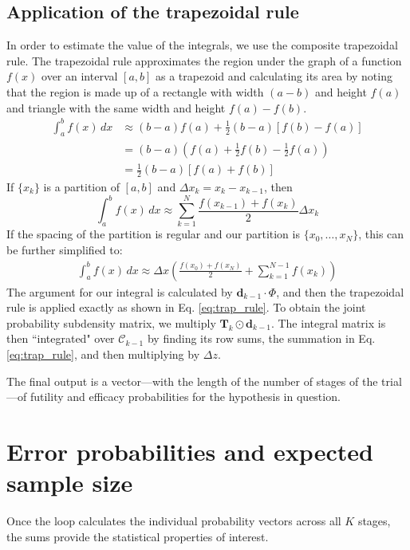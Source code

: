 \documentclass{article}
\begin{document}
\subsection{Application of the trapezoidal rule}
%
In order to estimate the value of the integrals, we use the composite trapezoidal rule. The trapezoidal rule approximates the region under the graph of a function $f(x)$ over an interval $[a, b]$ as a trapezoid and calculating its area by noting that the region is made up of a rectangle with width $(a-b)$ and height $f(a)$ and triangle with the same width and height $f(a)-f(b)$.
\begin{align}
    \int_a^b f(x)\,dx &\approx (b-a)f(a)+ \frac{1}{2}(b-a)[f(b)-f(a)] \\
    &=(b-a)\left( f(a)+\frac{1}{2}f(b)-\frac{1}{2}f(a) \right)\\
    &=\frac{1}{2}(b-a)[f(a)+f(b)]
\end{align}
%
If $\{x_k\}$ is a partition of $[a,b]$ and $\Delta x_k=x_k-x_{k-1}$, then
\begin{equation}
    \int_a^b f(x)\,dx \approx \sum_{k=1}^N \frac{f(x_{k-1})+f(x_k)}{2} \Delta x_k
\end{equation}
%
If the spacing of the partition is regular and our partition is $\{x_0,\dots,x_N\}$, this can be further simplified to:
%
\begin{align} \label{eq:trap_rule}
    \int_a^b f(x)\,dx \approx \Delta x\left(\frac{f(x_0)+f(x_N)}{2} + \sum_{k=1}^{N-1}f(x_k)\right)
\end{align}
%
The argument for our integral is calculated by $\mathbf{d}_{k-1} \cdot \Phi$, and then the trapezoidal rule is applied exactly as shown in Eq. \eqref{eq:trap_rule}. To obtain the joint probability subdensity matrix, we multiply $\mathbf{T}_{k} \odot \mathbf{d}_{k-1}$. The integral matrix is then ``integrated" over $\mathcal{C}_{k-1}$ by finding its row sums, the summation in Eq. \eqref{eq:trap_rule}, and then multiplying by $\Delta z$. 

The final output is a vector---with the length of the number of stages of the trial---of futility and efficacy probabilities for the hypothesis in question.
%
\section{Error probabilities and expected sample size}
%
Once the loop calculates the individual probability vectors across all $K$ stages, the sums provide the statistical properties of interest.
\end{document}
